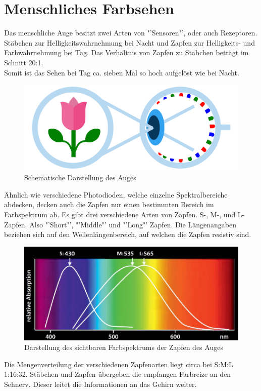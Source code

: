 \documentclass[11pt]{scrartcl}
\begin{document}
\section{Menschliches Farbsehen}
Das menschliche Auge besitzt zwei Arten von "'Sensoren"', oder auch Rezeptoren. Stäbchen zur Helligkeitswahrnehmung bei Nacht und
Zapfen zur Helligkeits- und Farbwahrnehmung bei Tag. Das Verhältnis von Zapfen zu Stäbchen beträgt im Schnitt 20:1.\\
Somit ist das Sehen bei Tag ca. sieben Mal so hoch aufgelöst wie bei Nacht.
\begin{figure}[H]
    \begin{center}
        \includegraphics[width=.8\textwidth]{images/eye.png}
    \end{center}
    \caption{Schematische Darstellung des Auges \cite{wisotopTriChro}}\label{fig:eye}
\end{figure}
\noindent
Ähnlich wie verschiedene Photodioden, welche einzelne Spektralbereiche abdecken, decken auch die Zapfen nur einen
bestimmten Bereich im Farbspektrum ab. Es gibt drei verschiedene Arten von Zapfen. S-, M-, und L-Zapfen. Also "'Short"',
"'Middle"' und "'Long"' Zapfen. Die Längenangaben beziehen sich auf den Wellenlängenbereich, auf welchen die Zapfen
resistiv sind.\\
\begin{figure}[H]
    \begin{center}
        \includegraphics[width=.8\textwidth]{images/eye_spectrum.png}
    \end{center}
    \caption{Darstellung des sichtbaren Farbspektrums der Zapfen des Auges}\label{fig:eye_spectrum}
\end{figure}
\noindent
Die Mengenverteilung der verschiedenen Zapfenarten liegt circa bei S:M:L 1:16:32. Stäbchen und Zapfen übergeben die
empfangen Farbreize an den Sehnerv. Dieser leitet die Informationen an das Gehirn weiter.
\clearpage
\end{document}
